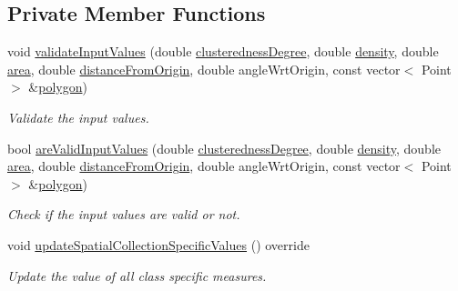 \subsection*{Private Member Functions}
\begin{DoxyCompactItemize}
\item 
void \hyperlink{classmultiscale_1_1analysis_1_1Region_a517b46fd89696f44086aafb1a9526995}{validate\-Input\-Values} (double \hyperlink{classmultiscale_1_1analysis_1_1SpatialCollection2D_acd11d0bbeb60a1168bd2c2fbbc6fe965}{clusteredness\-Degree}, double \hyperlink{classmultiscale_1_1analysis_1_1Region_af4eb62fddbe850271dfe15bb240b13bb}{density}, double \hyperlink{classmultiscale_1_1analysis_1_1SpatialCollection2D_ac570cc755e52aeb9deacf12d223a4a3a}{area}, double \hyperlink{classmultiscale_1_1analysis_1_1SpatialCollection2D_ac2a5d3f8c2cb878c710d821c536b8a4f}{distance\-From\-Origin}, double angle\-Wrt\-Origin, const vector$<$ Point $>$ \&\hyperlink{classmultiscale_1_1analysis_1_1Region_a40d1b47f30bb09c6a47521a968163b6d}{polygon})
\begin{DoxyCompactList}\small\item\em Validate the input values. \end{DoxyCompactList}\item 
bool \hyperlink{classmultiscale_1_1analysis_1_1Region_a6319de4734b11039dbb90dfdd3e30e31}{are\-Valid\-Input\-Values} (double \hyperlink{classmultiscale_1_1analysis_1_1SpatialCollection2D_acd11d0bbeb60a1168bd2c2fbbc6fe965}{clusteredness\-Degree}, double \hyperlink{classmultiscale_1_1analysis_1_1Region_af4eb62fddbe850271dfe15bb240b13bb}{density}, double \hyperlink{classmultiscale_1_1analysis_1_1SpatialCollection2D_ac570cc755e52aeb9deacf12d223a4a3a}{area}, double \hyperlink{classmultiscale_1_1analysis_1_1SpatialCollection2D_ac2a5d3f8c2cb878c710d821c536b8a4f}{distance\-From\-Origin}, double angle\-Wrt\-Origin, const vector$<$ Point $>$ \&\hyperlink{classmultiscale_1_1analysis_1_1Region_a40d1b47f30bb09c6a47521a968163b6d}{polygon})
\begin{DoxyCompactList}\small\item\em Check if the input values are valid or not. \end{DoxyCompactList}\item 
void \hyperlink{classmultiscale_1_1analysis_1_1Region_ac382fb7a5625d7ef573a311b8de8f248}{update\-Spatial\-Collection\-Specific\-Values} () override
\begin{DoxyCompactList}\small\item\em Update the value of all class specific measures. \end{DoxyCompactList}\item 

\end{DoxyCompactItemize}
